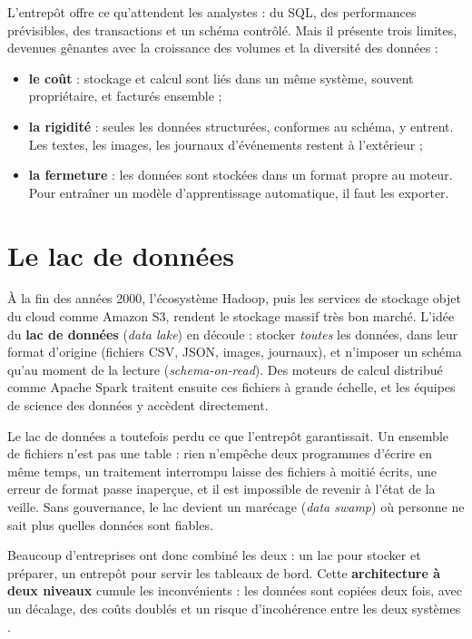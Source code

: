 L'entrepôt offre ce qu'attendent les analystes : du SQL, des performances prévisibles, des
transactions et un schéma contrôlé. Mais il présente trois limites, devenues gênantes avec la
croissance des volumes et la diversité des données :
\begin{itemize}[leftmargin=*,itemsep=2pt]
  \item \textbf{le coût} : stockage et calcul sont liés dans un même système, souvent propriétaire,
        et facturés ensemble ;
  \item \textbf{la rigidité} : seules les données structurées, conformes au schéma, y entrent. Les
        textes, les images, les journaux d'événements restent à l'extérieur ;
  \item \textbf{la fermeture} : les données sont stockées dans un format propre au moteur. Pour
        entraîner un modèle d'apprentissage automatique, il faut les exporter.
\end{itemize}

\section{Le lac de données}

À la fin des années 2000, l'écosystème Hadoop, puis les services de stockage objet du cloud comme
Amazon S3, rendent le stockage massif très bon marché. L'idée du \textbf{lac de
données} (\emph{data lake}) en découle : stocker \emph{toutes} les données,
dans leur format d'origine (fichiers CSV, JSON, images, journaux), et n'imposer un schéma qu'au
moment de la lecture (\emph{schema-on-read}). Des moteurs de calcul distribué comme Apache
Spark \citep{zaharia2016} traitent ensuite ces fichiers à grande échelle, et les équipes de science
des données y accèdent directement.

Le lac de données a toutefois perdu ce que l'entrepôt garantissait. Un ensemble de fichiers n'est
pas une table : rien n'empêche deux programmes d'écrire en même temps, un traitement interrompu
laisse des fichiers à moitié écrits, une erreur de format passe inaperçue, et il est impossible de
revenir à l'état de la veille. Sans gouvernance, le lac devient un \og marécage \fg{} (\emph{data
swamp}) où personne ne sait plus quelles données sont fiables.

Beaucoup d'entreprises ont donc combiné les deux : un lac pour stocker et préparer, un entrepôt
pour servir les tableaux de bord. Cette \textbf{architecture à deux niveaux} cumule les
inconvénients : les données sont copiées deux fois, avec un décalage, des coûts doublés et un
risque d'incohérence entre les deux systèmes \citep{armbrust2021}.

